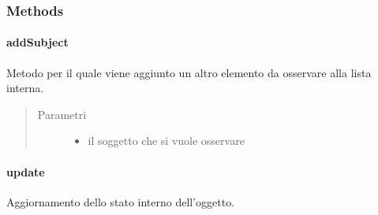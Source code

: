 \documentclass[letterpaper,10pt,italian]{sphinxmanual}
\begin{document}
\subsubsection{Methods}
\label{\detokenize{source/it/unicam/cs/pa/mastermind/ui/BoardObserver:methods}}

\paragraph{addSubject}
\label{\detokenize{source/it/unicam/cs/pa/mastermind/ui/BoardObserver:addsubject}}

\begin{fulllineitems}
\label{\detokenize{source/it/unicam/cs/pa/mastermind/ui/BoardObserver:it.unicam.cs.pa.mastermind.ui.BoardObserver.addSubject(BoardModel)}}
Metodo per il quale viene aggiunto un altro elemento da osservare alla lista interna.
\begin{quote}\begin{description}
\item[{Parametri}] \leavevmode\begin{itemize}
\item {} 
 \textendash{} il soggetto che si vuole osservare

\end{itemize}

\end{description}\end{quote}

\end{fulllineitems}



\paragraph{update}
\label{\detokenize{source/it/unicam/cs/pa/mastermind/ui/BoardObserver:update}}

\begin{fulllineitems}
\label{\detokenize{source/it/unicam/cs/pa/mastermind/ui/BoardObserver:it.unicam.cs.pa.mastermind.ui.BoardObserver.update()}}
Aggiornamento dello stato interno dell’oggetto.

\end{fulllineitems}
\end{document}
